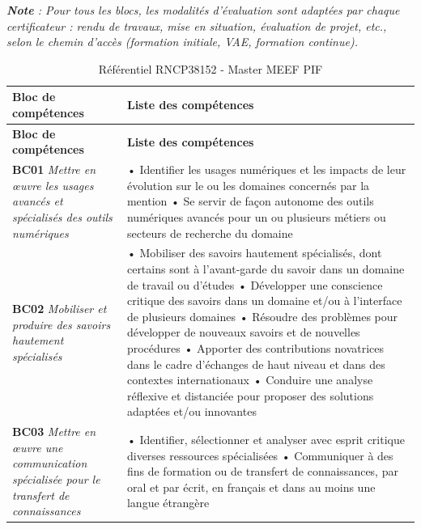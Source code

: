 \documentclass[12pt,a4paper]{report}
\begin{document}
{\small{}

\textit{\textbf{Note} : Pour tous les blocs, les modalités d'évaluation sont adaptées par chaque certificateur : rendu de travaux, mise en situation, évaluation de projet, etc., selon le chemin d'accès (formation initiale, VAE, formation continue).}

\vspace{0.5cm}

\begin{longtable}{|p{4cm}|p{10.5cm}|}
\caption{Référentiel RNCP38152 - Master MEEF PIF} \\
\hline
\textbf{Bloc de compétences} & \textbf{Liste des compétences} \\
\hline
\endfirsthead
\hline
\textbf{Bloc de compétences} & \textbf{Liste des compétences} \\
\hline
\endhead

\textbf{BC01} \newline
\textit{Mettre en œuvre les usages avancés et spécialisés des outils numériques} &
• Identifier les usages numériques et les impacts de leur évolution sur le ou les domaines concernés par la mention \newline
• Se servir de façon autonome des outils numériques avancés pour un ou plusieurs métiers ou secteurs de recherche du domaine \\
\hline

\textbf{BC02} \newline
\textit{Mobiliser et produire des savoirs hautement spécialisés} &
• Mobiliser des savoirs hautement spécialisés, dont certains sont à l'avant-garde du savoir dans un domaine de travail ou d'études \newline
• Développer une conscience critique des savoirs dans un domaine et/ou à l'interface de plusieurs domaines \newline
• Résoudre des problèmes pour développer de nouveaux savoirs et de nouvelles procédures \newline
• Apporter des contributions novatrices dans le cadre d'échanges de haut niveau et dans des contextes internationaux \newline
• Conduire une analyse réflexive et distanciée pour proposer des solutions adaptées et/ou innovantes \\
\hline

\textbf{BC03} \newline
\textit{Mettre en œuvre une communication spécialisée pour le transfert de connaissances} &
• Identifier, sélectionner et analyser avec esprit critique diverses ressources spécialisées \newline
• Communiquer à des fins de formation ou de transfert de connaissances, par oral et par écrit, en français et dans au moins une langue étrangère \\
\hline


\end{longtable}}
\end{document}

